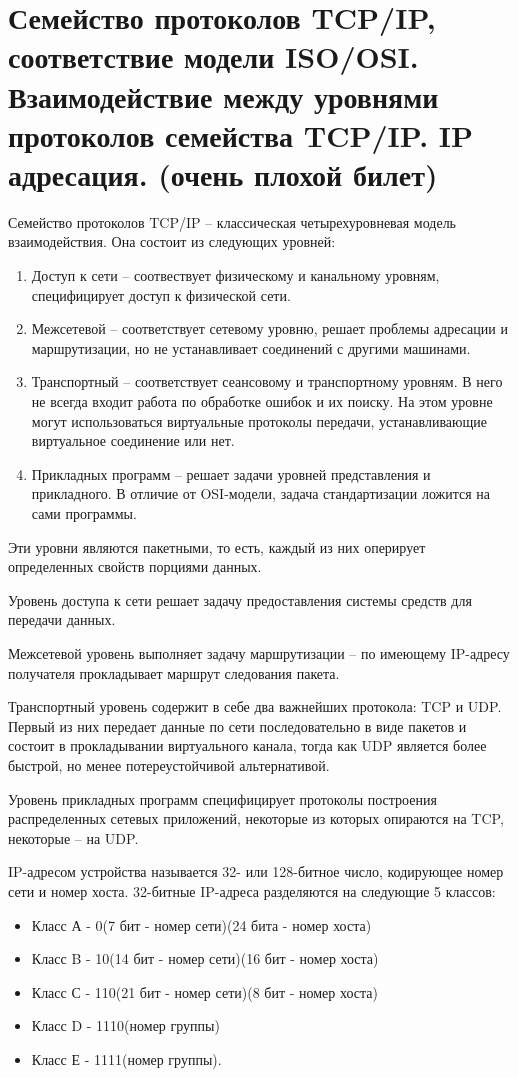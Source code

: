 \documentclass[a4paper,12pt,titlepage,finall]{article}
\begin{document}
\section{Семейство протоколов TCP/IP, соответствие модели
ISO/OSI. Взаимодействие между уровнями протоколов семейства TCP/IP. IP адресация. (очень плохой билет)}
Семейство протоколов TCP/IP -- классическая четырехуровневая модель взаимодействия. Она состоит из следующих уровней:
\begin{enumerate}
    \item Доступ к сети -- соотвествует физическому и канальному уровням, специфицирует доступ к физической сети.
    \item Межсетевой -- соответствует сетевому уровню, решает проблемы адресации и маршрутизации, но не устанавливает соединений с другими машинами.
    \item Транспортный -- соответствует сеансовому и транспортному уровням. В него не всегда входит работа по обработке ошибок и их поиску. На этом уровне могут использоваться виртуальные протоколы передачи, устанавливающие виртуальное соединение или нет.
    \item Прикладных программ -- решает задачи уровней представления и прикладного. В отличие от OSI-модели, задача стандартизации ложится на сами программы.
\end{enumerate}

Эти уровни являются пакетными, то есть, каждый из них оперирует определенных свойств порциями данных.

Уровень доступа к сети решает задачу предоставления системы средств для передачи данных.

Межсетевой уровень выполняет задачу маршрутизации -- по имеющему IP-адресу получателя прокладывает маршрут следования пакета.

Транспортный уровень содержит в себе два важнейших протокола: TCP и UDP. Первый из них передает данные по сети последовательно в виде пакетов и состоит в прокладывании виртуального канала, тогда как UDP является более быстрой, но менее потереустойчивой альтернативой.

Уровень прикладных программ специфицирует протоколы построения распределенных сетевых приложений, некоторые из которых опираются на TCP, некоторые -- на UDP.

IP-адресом устройства называется 32- или 128-битное число, кодирующее номер сети и номер хоста. 32-битные IP-адреса разделяются на следующие 5 классов:
\begin{itemize}
    \item Класс А - 0(7 бит - номер сети)(24 бита - номер хоста)
    \item Класс B - 10(14 бит - номер сети)(16 бит - номер хоста)
    \item Класс С - 110(21 бит - номер сети)(8 бит - номер хоста)
    \item Класс D - 1110(номер группы)
    \item Класс Е - 1111(номер группы).
\end{itemize}
\end{document}
